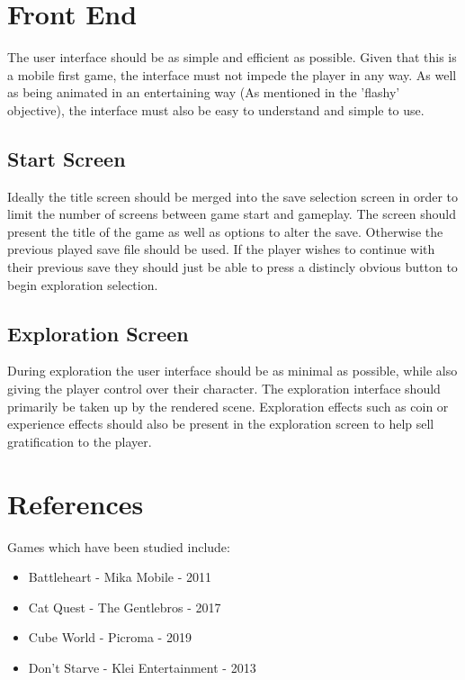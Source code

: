 \documentclass[a4paper]{scrreprt}
\begin{document}


\chapter{Front End}
The user interface should be as simple and efficient as possible.
Given that this is a mobile first game, the interface must not impede the player in any way.
As well as being animated in an entertaining way (As mentioned in the 'flashy' objective), the interface must also be easy to understand and simple to use.

\section{Start Screen}
Ideally the title screen should be merged into the save selection screen in order to limit the number of screens between game start and gameplay.
The screen should present the title of the game as well as options to alter the save.
Otherwise the previous played save file should be used.
If the player wishes to continue with their previous save they should just be able to press a distincly obvious button to begin exploration selection.

\section{Exploration Screen}
During exploration the user interface should be as minimal as possible, while also giving the player control over their character.
The exploration interface should primarily be taken up by the rendered scene.
Exploration effects such as coin or experience effects should also be present in the exploration screen to help sell gratification to the player.




\chapter{References}
Games which have been studied include:

    \begin{itemize}
        \item Battleheart - Mika Mobile - 2011
        \item Cat Quest - The Gentlebros - 2017
        \item Cube World - Picroma - 2019
        \item Don't Starve - Klei Entertainment - 2013
    \end{itemize}
\end{document}

